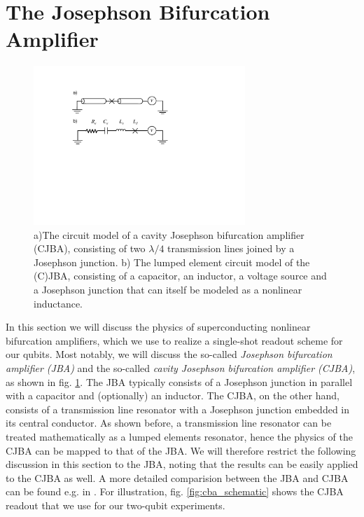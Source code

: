 \section{The Josephson Bifurcation Amplifier}

\begin{figure}
	\includegraphics[width=8cm]{"./material/figures/introduction/nonlinear resonator"}
	\caption{a)The circuit model of a cavity Josephson bifurcation amplifier (CJBA), consisting of two $\lambda/4$ transmission lines joined by a Josephson junction. b) The lumped element circuit model of the (C)JBA, consisting of a capacitor, an inductor, a voltage source and  a Josephson junction that can itself be modeled as a nonlinear inductance.}
	\label{fig:jba_schematic}
\end{figure}

In this section we will  discuss the physics of superconducting nonlinear bifurcation amplifiers, which we use to realize a single-shot readout scheme for our qubits. Most notably, we will discuss the so-called {\it Josephson bifurcation amplifier (JBA)} and the so-called {\it cavity Josephson bifurcation amplifier (CJBA)}, as shown in fig. \ref{fig:jba_schematic}. The JBA typically consists of a Josephson junction in parallel with a capacitor and (optionally) an inductor. The CJBA, on the other hand, consists of a transmission line resonator with a Josephson junction embedded in its central conductor. As shown before, a transmission line resonator can be treated mathematically as a lumped elements resonator, hence the physics of the CJBA can be mapped to that of the JBA. We will therefore restrict the following discussion in this section to the JBA, noting that the results can be easily applied to the CJBA as well. A more detailed comparision between the JBA and CJBA can be found e.g. in \cite{palacios-laloy_superconducting_2010}. For illustration, fig. \ref{fig:cba_schematic} shows the CJBA readout that we use for our two-qubit experiments. 


